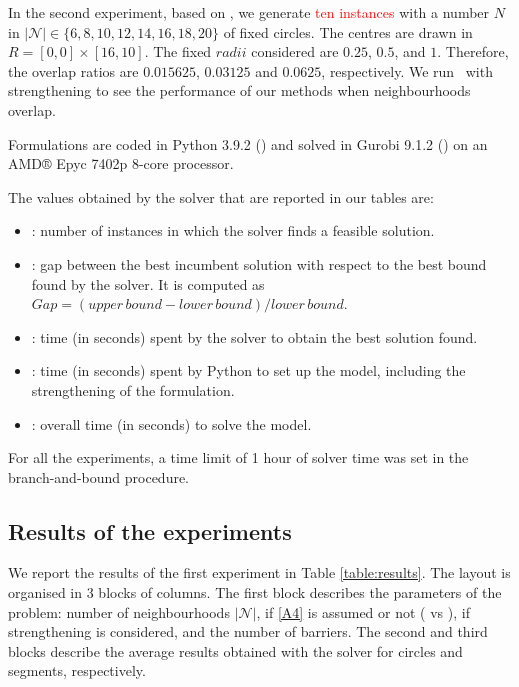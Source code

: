 \documentclass[a4paper,  review, authoryear, 1p.]{elsarticle}
\newcommand{\TSPHN}{{\sf{H-TSPHN}\xspace }}
\newcommand{\TSPN}{{\sf{H-TSPN}\xspace }}
\newcommand{\CV}[1]{{\color{red}#1}}
\begin{document}
In the second experiment, based on \cite{behdani2014}, we generate \textcolor{red}{ten instances} with a number $N$ in $|\mathcal N|\in\{6, 8, 10, 12, 14, 16, 18, 20\}$ of fixed circles. The centres are drawn in $R=[0, 0]\times[16, 10]$. The fixed $radii$ considered are $0.25$, $0.5$, and $1$. Therefore, the overlap ratios are $0.015625$, $0.03125$ and $0.0625$, respectively. We run \TSPN \ with strengthening to see the performance of our methods when neighbourhoods overlap.

Formulations are coded in Python 3.9.2 (\citet{vanrossum2009}) and solved in Gurobi 9.1.2 (\citet{gurobioptimizationllc2022}) on an AMD® Epyc 7402p 8-core processor.

The values obtained by the solver that are reported in our tables are:

\begin{itemize}
\item {}: number of instances in which the solver finds a feasible solution.
\item {}: gap between the best incumbent solution with respect to the best bound found by the solver. It is computed as $Gap=(upper\, bound - lower\, bound)/lower\, bound$.
\item {}: time \CV{(in seconds)} spent by the solver to obtain the best solution found.
\item {}: time \CV{(in seconds)} spent by Python to set up the model, including the strengthening of the formulation.
\item {}: overall time \CV{(in seconds)} to solve the model.
\end{itemize}

For all the experiments, a time limit of 1 hour of solver time was set in the branch-and-bound procedure.



\subsection{Results of the experiments}
We report the results of the first experiment in Table \ref{table:results}. The layout is organised in 3 blocks of columns. The first block describes the parameters of the problem: number of neighbourhoods $|\mathcal{N}|$, if \ref{A4} is assumed or not (\TSPHN\xspace vs \TSPN), if strengthening is considered, and the number of barriers. The second and third blocks describe the average results obtained with the solver for circles and segments, respectively. 
\end{document}
